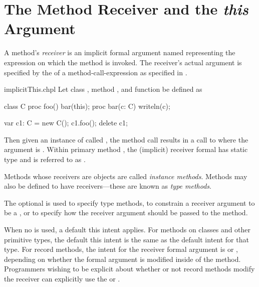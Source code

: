 \section{The Method Receiver and the {\em this} Argument}
\label{Method_receiver_and_this}

A method's \emph{receiver} is an implicit formal argument
named  representing the expression on which the method is
invoked.  The receiver's actual argument is specified by the
 of a method-call-expression as specified
in .




\begin{chapelexample}{implicitThis.chpl}
Let class , method , and function  be
defined as
\begin{chapel}
class C {
  proc foo() {
    bar(this);
  }
}
proc bar(c: C) { writeln(c); }
\end{chapel}
\begin{chapelpost}
var c1: C = new C();
c1.foo();
delete c1;
\end{chapelpost}
\begin{chapeloutput}
{}
\end{chapeloutput}
Then given an instance of  called , the method
call  results in a call to  where the
argument is .  Within primary method , the
(implicit) receiver formal has static type  and is referred to
as .
\end{chapelexample}

Methods whose receivers are objects are called \emph{instance
methods}.  Methods may also be defined to have 
receivers---these are known as \emph{type methods}.

The optional  is used to specify type methods, to
constrain a receiver argument to be a , or to specify how
the receiver argument should be passed to the method.

When no  is used, a default this intent applies. For
methods on classes and other primitive types, the default this intent is
the same as the default intent for that type.
For record methods, the intent for the receiver formal argument is 
or , depending on whether the formal argument is modified
inside of the method. Programmers wishing to be explicit about whether or
not record methods modify the receiver can explicitly use the 
or  .

